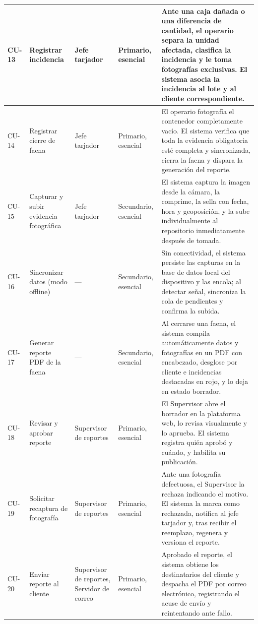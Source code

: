{\begin{longtable}{L{0.06\textwidth} L{0.18\textwidth} L{0.14\textwidth} L{0.11\textwidth} L{0.41\textwidth}}
CU-13 & Registrar incidencia & Jefe tarjador & Primario, esencial &
Ante una caja dañada o una diferencia de cantidad, el operario separa la unidad afectada, clasifica
la incidencia y le toma fotografías exclusivas. El sistema asocia la incidencia al lote y al
cliente correspondiente. \\
\midrule

CU-14 & Registrar cierre de faena & Jefe tarjador & Primario, esencial &
El operario fotografía el contenedor completamente vacío. El sistema verifica que toda la evidencia
obligatoria esté completa y sincronizada, cierra la faena y dispara la generación del reporte. \\
\midrule

CU-15 & Capturar y subir evidencia fotográfica & Jefe tarjador & Secundario, esencial &
El sistema captura la imagen desde la cámara, la comprime, la sella con fecha, hora y
geoposición, y la sube individualmente al repositorio inmediatamente después de tomada. \\
\midrule

CU-16 & Sincronizar datos (modo offline) & ---  &
Secundario, esencial &
Sin conectividad, el sistema persiste las capturas en la base de datos local del dispositivo y las
encola; al detectar señal, sincroniza la cola de pendientes y confirma la subida. \\
\midrule

CU-17 & Generar reporte PDF de la faena & ---  &
Secundario, esencial &
Al cerrarse una faena, el sistema compila automáticamente datos y fotografías en un PDF con
encabezado, desglose por cliente e incidencias destacadas en rojo, y lo deja en estado borrador. \\
\midrule

CU-18 & Revisar y aprobar reporte & Supervisor de reportes & Primario, esencial &
El Supervisor abre el borrador en la plataforma web, lo revisa visualmente y lo aprueba. El sistema
registra quién aprobó y cuándo, y habilita su publicación. \\
\midrule

CU-19 & Solicitar recaptura de fotografía & Supervisor de reportes & Primario, esencial &
Ante una fotografía defectuosa, el Supervisor la rechaza indicando el motivo. El sistema la marca
como rechazada, notifica al jefe tarjador y, tras recibir el reemplazo, regenera y versiona el
reporte. \\
\midrule

CU-20 & Enviar reporte al cliente & Supervisor de reportes, Servidor de correo &
Primario, esencial &
Aprobado el reporte, el sistema obtiene los destinatarios del cliente y despacha el PDF por correo
electrónico, registrando el acuse de envío y reintentando ante fallo. \\
\midrule


\end{longtable}}
